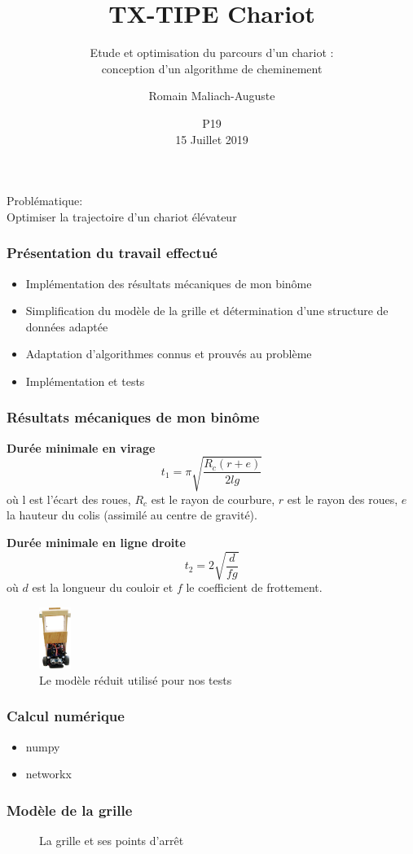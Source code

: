 \documentclass[frenchb]{beamer}
\title{TX-TIPE Chariot}
\subtitle{Etude et optimisation du parcours d'un chariot :\\conception d'un algorithme de cheminement}
\date{P19\\15 Juillet 2019}
\institute{Lycée Pierre d'Ailly - Université de Technologie de Compiègne}
\author{Romain Maliach-Auguste}
\begin{document}
\frame{\titlepage}
\begin{frame}
	\huge{Problématique:\\}
	\guillemotleft Optimiser la trajectoire d'un chariot élévateur\guillemotright
\end{frame}
  \begin{frame}
    \frametitle{Présentation du travail effectué}
	  \begin{itemize}
			 \item Implémentation des résultats mécaniques de mon binôme
			 \item Simplification du modèle de la grille et détermination d'une structure de données adaptée
			 \item Adaptation d'algorithmes connus et prouvés au problème
			 \item Implémentation et tests
	  \end{itemize}
  \end{frame}
  \begin{frame}
	  \frametitle{Résultats mécaniques de mon binôme}
	  \textbf{Durée minimale en virage}
	  	\[t_1 = \pi\sqrt{\frac{R_c(r+e)}{2lg}}\]
		où l est l'écart des roues, $R_c$ est le rayon de courbure, $r$ est le rayon des roues, $e$ la hauteur du colis (assimilé au centre de gravité).

	\textbf{Durée minimale en ligne droite}
		\[t_2=2\sqrt{\frac{d}{fg}}\]
		où $d$ est la longueur du couloir et $f$ le coefficient de frottement.
	 
	  \begin{figure}
		  \centering
		  \includegraphics[height=2cm]{protoChariot.png}
		  \caption{Le modèle réduit utilisé pour nos tests}
	  \end{figure}
  \end{frame}
  \begin{frame}
	  \frametitle{Calcul numérique}
	  \begin{itemize}
		  \item numpy
		  \item networkx
	  \end{itemize}
  \end{frame}
  \begin{frame}
	  \frametitle{Modèle de la grille}
	  \begin{figure}
		  \centering
		  
		  \caption{La grille et ses points d'arrêt}
		  \label{grille}
	  \end{figure}
  \end{frame}
\end{document}
